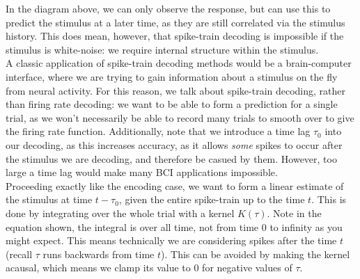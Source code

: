 \documentclass{article}
\begin{document}
\begin{figure}[H]
\centering
{}
\end{figure}

In the diagram above, we can only observe the response, but can use this to predict the stimulus at a later time, as they are still correlated via the stimulus history. This does mean, however, that spike-train decoding is impossible if the stimulus is white-noise: we require internal structure within the stimulus.\\

A classic application of spike-train decoding methods would be a brain-computer interface, where we are trying to gain information about a stimulus on the fly from neural activity. For this reason, we talk about spike-train decoding, rather than firing rate decoding: we want to be able to form a prediction for a single trial, as we won't necessarily be able to record many trials to smooth over to give the firing rate function. Additionally, note that we introduce a time lag $\tau_0$ into our decoding, as this increases accuracy, as it allows \textit{some} spikes to occur after the stimulus we are decoding, and therefore be casued by them. However, too large a time lag would make many BCI applications impossible.\\

Proceeding exactly like the encoding case, we want to form a linear estimate of the stimulus at time $t-\tau_0$, given the entire spike-train up to the time $t$. This is done by integrating over the whole trial with a kernel $K(\tau)$. Note in the equation shown, the integral is over all time, not from time 0 to infinity as you might expect. This means technically we are considering spikes after the time $t$ (recall $\tau$ runs backwards from time $t$). This can be avoided by making the kernel acausal, which means we clamp its value to 0 for negative values of $\tau$.
\end{document}
